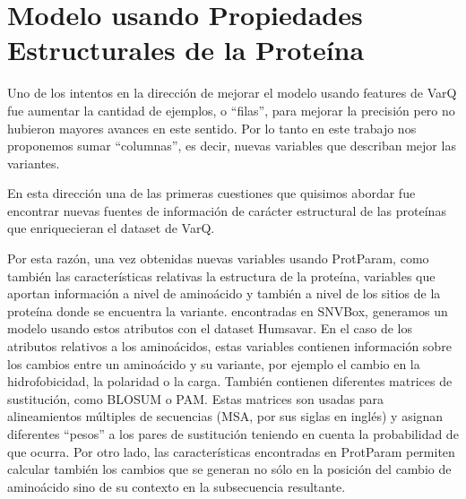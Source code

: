 \section{Modelo usando Propiedades Estructurales de la Proteína}

Uno de los intentos en la dirección de mejorar el modelo usando features de VarQ fue aumentar la cantidad de ejemplos, o ``filas'', para mejorar la precisión pero no hubieron mayores avances en este sentido. Por lo tanto en este trabajo nos proponemos sumar ``columnas'', es decir, nuevas variables que describan mejor las variantes.

En esta dirección una de las primeras cuestiones que quisimos abordar fue encontrar nuevas fuentes de información de carácter estructural de las proteínas que enriquecieran el dataset de VarQ. 

Por esta razón, una vez obtenidas nuevas variables usando ProtParam, como también las características relativas la estructura de la proteína, variables que aportan información a nivel de aminoácido y también a nivel de los sitios de la proteína donde se encuentra la variante. encontradas en SNVBox, generamos un modelo usando estos atributos con el dataset Humsavar. En el caso de los atributos relativos a los aminoácidos, estas variables contienen información sobre los cambios entre un aminoácido y su variante, por ejemplo el cambio en la hidrofobicidad, la polaridad o la carga. También contienen diferentes matrices de sustitución, como BLOSUM o PAM. Estas matrices son usadas para alineamientos múltiples de secuencias (MSA, por sus siglas en inglés) y asignan diferentes ``pesos'' a los pares de sustitución teniendo en cuenta la probabilidad de que ocurra. Por otro lado, las características encontradas en ProtParam permiten calcular también los cambios que se generan no sólo en la posición del cambio de aminoácido sino de su contexto en la subsecuencia resultante. 



